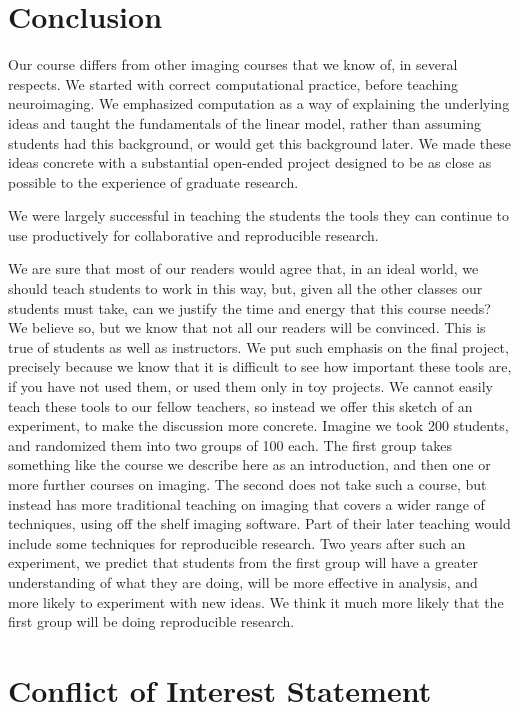 \section*{Conclusion}

Our course differs from other imaging courses that we know of, in several
respects.  We started with correct computational practice, before teaching
neuroimaging.  We emphasized computation as a way of explaining the underlying
ideas and taught the fundamentals of the linear model, rather than assuming
students had this background, or would get this background later.
We made these ideas concrete with a substantial open-ended project designed to
be as close as possible to the experience of graduate research.

We were largely successful in teaching the students the tools they can continue
to use productively for collaborative and reproducible research.

We are sure that most of our readers would agree that, in an ideal world, we
should teach students to work in this way, but, given all the other
classes our students must take, can we justify the time and energy that this
course needs?  We believe so, but we know that not all our readers will be
convinced.  This is true of students as well as
instructors.  We put such emphasis on the final project, precisely because we
know that it is difficult to see how important these tools are, if you
have not used them, or used them only in toy projects.  We cannot easily teach
these tools to our fellow teachers, so instead we offer this sketch of an
experiment, to make the discussion more concrete.  Imagine we took 200
students, and randomized them into two groups of 100 each.  The first group
takes something like the course we describe here as an introduction, and then
one or more further courses on imaging.  The second does not take such a
course, but instead has more traditional teaching on imaging that covers a
wider range of techniques, using off the shelf imaging software.  Part of
their later teaching would include some techniques for reproducible research.
Two years after such an experiment, we predict that
students from the first group will have a greater understanding of what they
are doing, will be more effective in analysis, and more likely to
experiment with new ideas.  We think it much more likely that the first group
will be doing reproducible research.

\section*{Conflict of Interest Statement}

